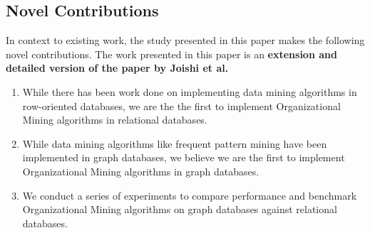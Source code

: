 \documentclass[11pt]{article}
\begin{document}
\subsection{Novel Contributions}
\par{In context to existing work, the study presented in this paper makes the following novel contributions. The work presented in this paper is an \textbf{extension and detailed version of the paper by Joishi et al.} \cite{joishi2015}
\begin{enumerate}
\item While there has been work done on implementing data mining algorithms in row-oriented databases, we are the the first to implement Organizational Mining algorithms in relational databases.
\item While data mining algorithms like frequent pattern mining have been implemented in graph databases, we believe we are the first to implement Organizational Mining algorithms in graph databases.
\item We conduct a series of experiments to compare performance and benchmark Organizational Mining algorithms on graph databases against relational databases.
\end{enumerate}}


%
\end{document}
